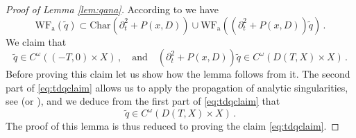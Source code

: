 \documentclass[
	fontsize=11pt, 
	twoside=false, 
	abstract=true, 
	a4paper,
]{scrartcl}
\newcommand{\dd}{\mathrm{d}}
\newcommand{\del}{\partial}
\newcommand{\td}[1]{\tilde{#1}}
\newcommand{\an}{\quad\text{and}\quad}
\newcommand{\wf}{\mathrm{WF}_{\mathrm{a}}}
\begin{document}
\begin{proof}[Proof of Lemma \ref{lem:qana}]
%
%

	According to \cite[Thm.~8.6.1]{hoermander1} we have 
	\[
		\wf(\td{q}) \subset \mathrm{Char}\left(\del_t^2+P(x,D)\right)\cup \wf\left((\del_t^2+P(x,D))\td{q}\right)\,.
	\]
	We claim that
	\begin{equation}\label{eq:tdqclaim}
		\td{q} \in C^\omega((-T,0)\times X)\,, \an (\del_t^2+P(x,D))\td{q}\in C^\omega(D(T,X)\times X)\,.
	\end{equation}
	Before proving this claim let us show how the lemma follows from it. The second part of \cref{eq:tdqclaim} allows us to apply the propagation of analytic singularities, see \cite[Thm.~7.3]{zbMATH03359011} (or \cite[Thm.~24.8.6]{MR4436039}), and we deduce from the first part of \cref{eq:tdqclaim} that
	\[
		\td{q}\in C^\omega(D(T,X)\times X)\,.
	\]
	The proof of this lemma is thus reduced to proving the claim \cref{eq:tdqclaim}. 


\end{proof}
\end{document}
